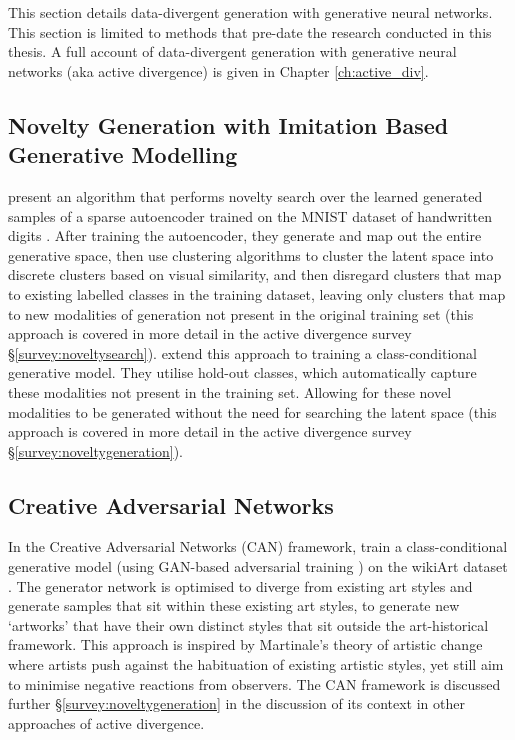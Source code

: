 This section details data-divergent generation with generative neural networks. 
This section is limited to methods that pre-date the research conducted in this thesis.
A full account of data-divergent generation with generative neural networks (aka active divergence) is given in Chapter \ref{ch:active_div}.

\subsection{Novelty Generation with Imitation Based Generative Modelling}

\citet{kazakcci2016digits} present an algorithm that performs novelty search over the learned generated samples of a sparse autoencoder trained on the MNIST dataset of handwritten digits \citep{lecun1998gradient}.
After training the autoencoder, they generate and map out the entire generative space, then use clustering algorithms to cluster the latent space into discrete clusters based on visual similarity, and then disregard clusters that map to existing labelled classes in the training dataset, leaving only clusters that map to new modalities of generation not present in the original training set (this approach is covered in more detail in the active divergence survey \S \ref{survey:noveltysearch}). 
\citep{cherti2017out} extend this approach to training a class-conditional generative model. 
They utilise hold-out classes, which automatically capture these modalities not present in the training set. 
Allowing for these novel modalities to be generated without the need for searching the latent space (this approach is covered in more detail in the active divergence survey \S \ref{survey:noveltygeneration}).   

\subsection{Creative Adversarial Networks}

In the Creative Adversarial Networks (CAN) framework, \cite{elgammal2017can} train a class-conditional generative model (using GAN-based adversarial training \citep{goodfellow2014generative}) on the wikiArt dataset \citep{saleh2016large}. 
The generator network is optimised to diverge from existing art styles and generate samples that sit within these existing art styles, to generate new `artworks' that have their own distinct styles that sit outside the art-historical framework.
This approach is inspired by Martinale's theory of artistic change \citep{martindale1990clockwork} where artists push against the habituation of existing artistic styles, yet still aim to minimise negative reactions from observers. 
The CAN framework is discussed further \S \ref{survey:noveltygeneration} in the discussion of its context in other approaches of active divergence. 

